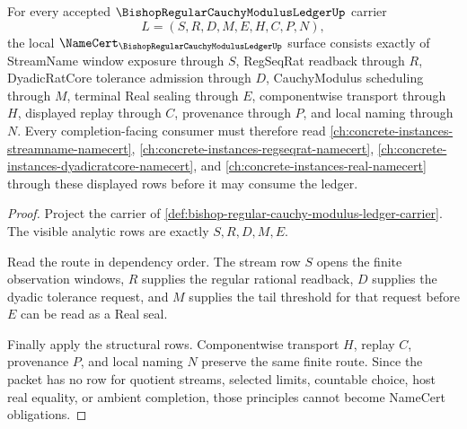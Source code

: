 \begin{theorem}
\label{thm:bishop-regular-cauchy-modulus-ledger-namecert-obligations}
For every accepted $\BishopRegularCauchyModulusLedgerUp$ carrier
$$
L=(S,R,D,M,E,H,C,P,N),
$$
the local $\NameCert_{\BishopRegularCauchyModulusLedgerUp}$ surface consists exactly of StreamName window exposure through $S$, RegSeqRat readback through $R$, DyadicRatCore tolerance admission through $D$, CauchyModulus scheduling through $M$, terminal Real sealing through $E$, componentwise transport through $H$, displayed replay through $C$, provenance through $P$, and local naming through $N$. Every completion-facing consumer must therefore read \autoref{ch:concrete-instances-streamname-namecert}, \autoref{ch:concrete-instances-regseqrat-namecert}, \autoref{ch:concrete-instances-dyadicratcore-namecert}, and \autoref{ch:concrete-instances-real-namecert} through these displayed rows before it may consume the ledger.
\end{theorem}
\begin{proof}
Project the carrier of \autoref{def:bishop-regular-cauchy-modulus-ledger-carrier}. The visible analytic rows are exactly $S,R,D,M,E$.

Read the route in dependency order. The stream row $S$ opens the finite observation windows, $R$ supplies the regular rational readback, $D$ supplies the dyadic tolerance request, and $M$ supplies the tail threshold for that request before $E$ can be read as a Real seal.

Finally apply the structural rows. Componentwise transport $H$, replay $C$, provenance $P$, and local naming $N$ preserve the same finite route. Since the packet has no row for quotient streams, selected limits, countable choice, host real equality, or ambient completion, those principles cannot become NameCert obligations.
\end{proof}

